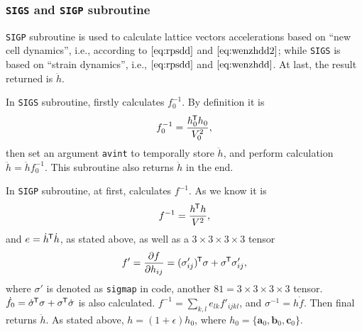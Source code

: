 
\subsubsection{\texttt{SIGS} and \texttt{SIGP} subroutine}
\label{sssec:sigs&p}

\texttt{SIGP} subroutine is used to calculate lattice vectors accelerations
based on ``new cell dynamics'', i.e., according to $\eqref{eq:rpsdd}$ and
$\eqref{eq:wenzhdd2}$; while \texttt{SIGS} is based on ``strain dynamics'',
i.e., $\eqref{eq:rpsdd}$ and $\eqref{eq:wenzhdd}$.
At last, the result returned is $\ddot{h}$.

In \texttt{SIGS} subroutine,
firstly calculates $f_0^{-1}$. By definition it is
\begin{equation}
	f_0^{-1} = \frac{ h_0 ^{\mkern-1.5mu\mathsf{T}} h_0}{ V_0^2 },
\end{equation}
then set an argument \texttt{avint} to temporally store $\ddot{h}$,
and perform calculation $\ddot{h} = \ddot{h} f_0^{-1}$.
This subroutine also returns $\ddot{h}$ in the end.

In \texttt{SIGP} subroutine,
at first, calculates $f^{-1}$. As we know it is
\begin{equation}
	f^{-1} = \frac{ h ^{\mkern-1.5mu\mathsf{T}} h }{ V^2 },
\end{equation}
and $e = \dot{ h }^{\mkern-1.5mu\mathsf{T}} \dot{ h }$, as stated above, as well as
a $3\times 3 \times 3 \times 3$ tensor
\begin{equation}
	f ' = \frac{ \partial f }{ \partial h_{ij} } = (\sigma'_{ij})^{\mkern-1.5mu\mathsf{T}} \sigma
	+ \sigma ^{\mkern-1.5mu\mathsf{T}} \sigma'_{ij},
\end{equation}
where $\sigma'$ is denoted as \texttt{sigmap} in code, another $81 = 3\times 3
	\times 3 \times 3$ tensor.
$\dot{f}_0 = \dot{ \sigma } ^{\mkern-1.5mu\mathsf{T}} \sigma + \sigma ^{\mkern-1.5mu\mathsf{T}} \dot{ \sigma }$ is
also calculated.
$f^{-1} = \sum_{k, l} e_{lk} f'_{ijkl}$, and $\sigma^{-1} = h \dot{ f }$.
Then final returns $\ddot{h}$. As stated above, $h = (1 + \epsilon) h_0$,
where $h_0 = \{ \bm{a}_0, \bm{b}_0, \bm{c}_0 \}$.

